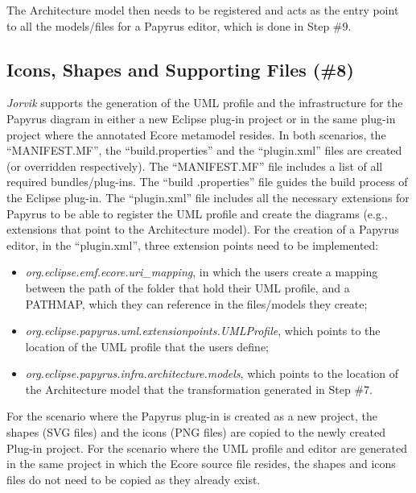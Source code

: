 The Architecture model then needs to be registered and acts as the entry point to all the models/files for a Papyrus editor, which is done in Step \#9.

\subsection{Icons, Shapes and Supporting Files (\#8)}
\label{sec:supportingFiles}
\textit{Jorvik} supports the generation of the UML profile and the infrastructure for the Papyrus diagram in either a new Eclipse plug-in project or in the same plug-in project where the annotated Ecore metamodel resides. 
In both scenarios, the ``MANIFEST.MF'', the ``build.properties'' and the ``plugin.xml'' files are created (or overridden respectively). 
The ``MANIFEST.MF'' file includes a list of all required bundles/plug-ins.
The ``build .properties'' file guides the build process of the Eclipse plug-in.
The ``plugin.xml'' file includes all the necessary extensions for Papyrus to be able to register the UML profile and create the diagrams (e.g., extensions that point to the Architecture model). 
For the creation of a Papyrus editor, in the ``plugin.xml'', three extension points need to be implemented:
\begin{itemize}
	\item \textit{org.eclipse.emf.ecore.uri\_mapping}, in which the users create a mapping between the path of the folder that hold their UML profile, and a PATHMAP, which they can reference in the files/models they create;
	\item \textit{org.eclipse.papyrus.uml.extensionpoints.UMLProfile}, which points to the location of the UML profile that the users define;
	\item \textit{org.eclipse.papyrus.infra.architecture.models}, which points to the location of the Architecture model that the transformation generated in Step \#7.
\end{itemize}

For the scenario where the Papyrus plug-in is created as a new project, the shapes (SVG files) and the icons (PNG files) are copied to the newly created Plug-in project. 
For the scenario where the UML profile and editor are generated in the same project in which the Ecore source file resides, the shapes and icons files do not need to be copied as they already exist.

